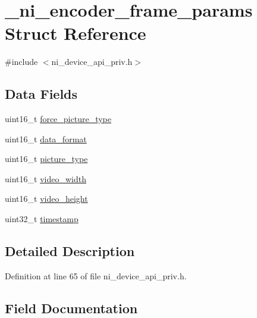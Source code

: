 \hypertarget{struct__ni__encoder__frame__params}{}\section{\+\_\+ni\+\_\+encoder\+\_\+frame\+\_\+params Struct Reference}
\label{struct__ni__encoder__frame__params}


{\ttfamily \#include $<$ni\+\_\+device\+\_\+api\+\_\+priv.\+h$>$}

\subsection*{Data Fields}
\begin{DoxyCompactItemize}
\item 
uint16\+\_\+t \mbox{\hyperlink{struct__ni__encoder__frame__params_a10042cc3071a6d20bd2d729962fcf1d6}{force\+\_\+picture\+\_\+type}}
\item 
uint16\+\_\+t \mbox{\hyperlink{struct__ni__encoder__frame__params_ad77c91b6f503d8ed5a32c2b9e3e20686}{data\+\_\+format}}
\item 
uint16\+\_\+t \mbox{\hyperlink{struct__ni__encoder__frame__params_aedcaed113a9e3bb164b8055a645aeb6b}{picture\+\_\+type}}
\item 
uint16\+\_\+t \mbox{\hyperlink{struct__ni__encoder__frame__params_a7e13f7f50a6a67ac38b8a9057b677210}{video\+\_\+width}}
\item 
uint16\+\_\+t \mbox{\hyperlink{struct__ni__encoder__frame__params_ae62d455c07515a709b2ccd014a29dd62}{video\+\_\+height}}
\item 
uint32\+\_\+t \mbox{\hyperlink{struct__ni__encoder__frame__params_ab20b0c7772544cf5d318507f34231fbe}{timestamp}}
\end{DoxyCompactItemize}


\subsection{Detailed Description}


Definition at line 65 of file ni\+\_\+device\+\_\+api\+\_\+priv.\+h.



\subsection{Field Documentation}
\mbox{\label{struct__ni__encoder__frame__params_ad77c91b6f503d8ed5a32c2b9e3e20686}} 
